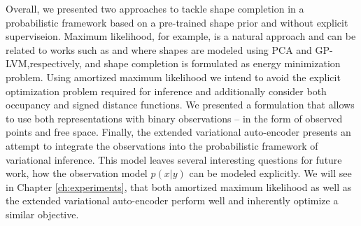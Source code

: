 Overall, we presented two approaches to tackle shape completion in a probabilistic
framework based on a pre-trained shape prior and without explicit superviseion.
Maximum likelihood, for example,
is a natural approach and can be related to works such as
\cite{EngelmannStuecklerLeibe:2016,EngelmannLeibe:2017} and \cite{DameReid:2013}
where shapes are modeled using PCA and GP-LVM,respectively,
and shape completion is formulated as energy minimization problem.
Using amortized maximum likelihood we intend to avoid the explicit optimization
problem required for inference and additionally consider both occupancy
and signed distance functions. We presented a formulation
that allows to use both representations with binary observations -- \eg in the form of
observed points and free space. Finally, the extended variational auto-encoder
presents an attempt to integrate the observations into the probabilistic framework
of variational inference. This model leaves several interesting questions for
future work, \eg how the observation model $p(x|y)$ can be modeled explicitly.
We will see in Chapter \ref{ch:experiments}, that both amortized maximum likelihood
as well as the extended variational auto-encoder perform well and inherently
optimize a similar objective.

